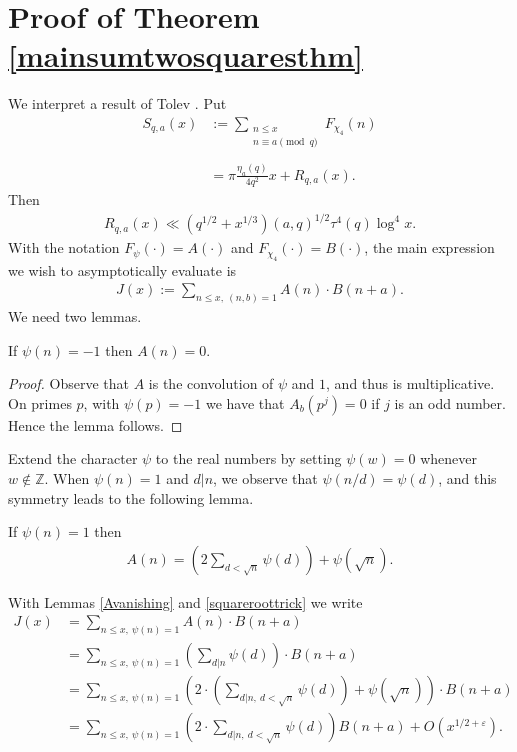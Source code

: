 \documentclass[12pt]{amsart}
\newcommand{\1}{\mathmybb{1}}
\begin{document}
\section{Proof of Theorem \ref{mainsumtwosquaresthm}}
We interpret a result of Tolev \cite[Eqn. (10)]{Tolev}.
Put
\begin{align*}
S_{q,a}(x) &:= \sum_{\substack{n \leq x \\ n \equiv a \pmod{q}}} F_{\chi_{4}}(n) \\\\
&=\pi\frac{\eta_{a}(q)}{4q^2}x + R_{q,a}(x).
\end{align*}
Then
\begin{align}
\label{TolevLem}
R_{q,a}(x) \ll (q^{1/2} + x^{1/3})(a,q)^{1/2} \tau^4(q) \log^4x.
\end{align}
With the notation $F_{\psi}(\cdot) = A(\cdot)$ and $F_{\chi_{4}}(\cdot) = B(\cdot)$, the main expression we wish to asymptotically evaluate is
\begin{align*}
J(x) := \sum_{n \leq x, \ (n,b) = 1} A(n)\cdot B(n+a).
\end{align*}
We need two lemmas.
\begin{lem}
\label{Avanishing}
If $\psi(n) = -1$ then $A(n)=0$.
\end{lem}
\begin{proof}
Observe that $A$ is the convolution of $\psi$ and $1$, and thus is multiplicative. On primes $p$, with $\psi(p) = -1$ we have that $A_{b}(p^j) = 0$ if $j$ is an odd number. Hence the lemma follows.
\end{proof}
Extend the character $\psi$ to the real numbers by setting $\psi(w) = 0$ whenever $w \not \in \mathbb{Z}$. When $\psi(n) = 1$ and $d|n$, we observe that $\psi(n/d) = \psi(d)$, and this symmetry leads to the following lemma.
\begin{lem}
\label{squareroottrick}
If $\psi(n)= 1$ then
\begin{align*}
A(n) = \left(2\sum_{d < \sqrt{n}}\psi(d)\right) +\psi(\sqrt{n}).
\end{align*}
\end{lem}
With Lemmas \ref{Avanishing} and \ref{squareroottrick} we write
\begin{align*}
J(x) &= \sum_{n\leq x, \ \psi(n) = 1}A(n)\cdot B(n+a)\\
&= \sum_{n\leq x, \ \psi(n) = 1}\left(\sum_{d|n}\psi(d)\right)\cdot B(n+a)\\
&= \sum_{n\leq x, \ \psi(n) = 1}\left(2\cdot\left( \sum_{d|n, \ d<\sqrt{n}}\psi(d)\right) + \psi(\sqrt{n})\right)\cdot B(n+a)\\
&= \sum_{n\leq x, \ \psi(n) = 1}\left(2\cdot \sum_{d|n, \ d<\sqrt{n}}\psi(d) \right)B(n+a) + O(x^{1/2 + \varepsilon}).
\end{align*}
\end{document}
